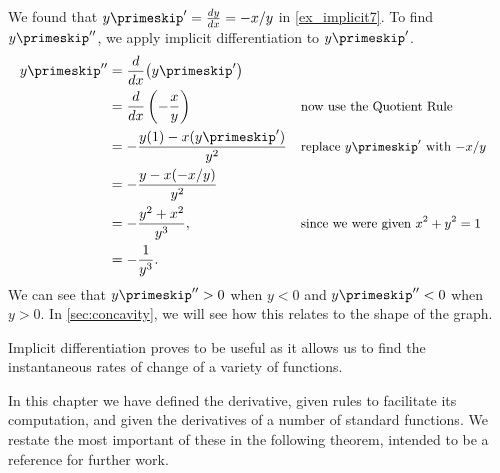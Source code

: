 {We found that $y\primeskip' = \frac{dy}{dx} = -x/y$ in \autoref{ex_implicit7}. To find $y\primeskip''$, we apply implicit differentiation to $y\primeskip'$.
\begin{align*}
	y\primeskip''
	&= \frac{d}{dx}\big(y\primeskip'\big) \\
	&= \frac{d}{dx}\left(-\frac xy\right) && \text{\small now use the Quotient Rule} \\
	&= -\frac{y(1) - x(y\primeskip')}{y^2} && \text{\small replace $y\primeskip'$ with $-x/y$} \\
	&= -\frac{y-x(-x/y)}{y^2}\\
	&= -\frac{y^2+x^2}{y^3}, && \text{\small since we were given $x^2+y^2=1$} \\
	&= -\frac1{y^3}.
\end{align*}
We can see that $y\primeskip''>0$ when $y<0$ and $y\primeskip''<0$ when $y>0$. In \autoref{sec:concavity}, we will see how this relates to the shape of the graph.}


Implicit differentiation proves to be useful as it allows us to find the instantaneous rates of change of a variety of functions.

In this chapter we have defined the derivative, given rules to facilitate its computation, and given the derivatives of a number of standard functions. We restate the most important of these in the following theorem, intended to be a reference for further work.

